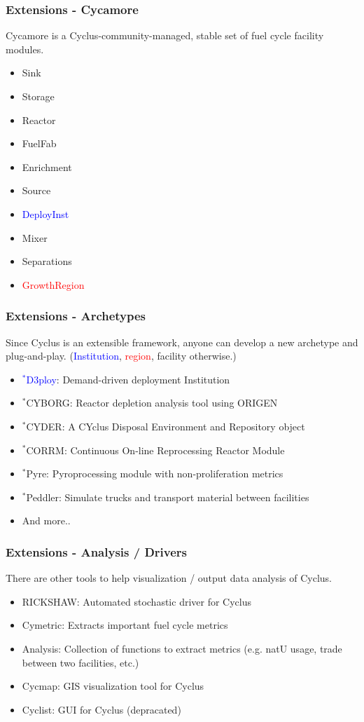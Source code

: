 \begin{frame}
	\frametitle{Extensions - Cycamore}
	Cycamore is a Cyclus-community-managed, stable set of fuel cycle facility modules. 
	\begin{itemize}
		\item Sink
		\item Storage
		\item Reactor
		\item FuelFab
		\item Enrichment
		\item Source
		\item \textcolor{blue}{DeployInst}
		\item Mixer
		\item Separations
		\item \textcolor{red}{GrowthRegion}
	\end{itemize}
\end{frame}

\begin{frame}
	\frametitle{Extensions - Archetypes}
	Since Cyclus is an extensible framework, anyone can develop a new archetype and plug-and-play. (\textcolor{blue}{Institution}, \textcolor{red}{region}, facility otherwise.)
	\begin{itemize}
		\item \textcolor{blue}{$^*$D3ploy}: Demand-driven deployment Institution \cite{noauthor_d3ploy:_2018} 
		\item $^*$CYBORG: Reactor depletion analysis tool using ORIGEN \cite{skutnik_cyborg:_2016}
		\item $^*$CYDER: A CYclus Disposal Environment and Repository object \cite{huff_cyclus_2013}
		\item $^*$CORRM: Continuous On-line Reprocessing Reactor Module \cite{recycle_recycle:_2018}
		\item $^*$Pyre: Pyroprocessing module with non-proliferation metrics \cite{westphal_signatures_2018}
        \item $^*$Peddler: Simulate trucks and transport material between facilities \cite{noauthor_peddler:_2018}
		\item And more..
	\end{itemize}
\end{frame}

\begin{frame}
	\frametitle{Extensions - Analysis / Drivers}
	There are other tools to help visualization / output data analysis of Cyclus.
	\begin{itemize}
		\item RICKSHAW: Automated stochastic driver for Cyclus
		\item Cymetric: Extracts important fuel cycle metrics
		\item Analysis: Collection of functions to extract metrics (e.g. natU usage, trade between two facilities, etc.) 
		\item Cycmap: GIS visualization tool for Cyclus
		\item Cyclist: GUI for Cyclus (depracated)
	\end{itemize}
\end{frame}


